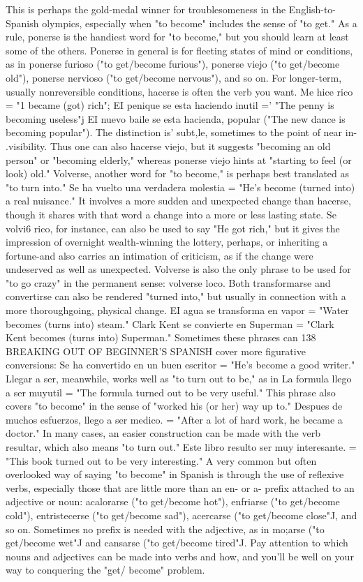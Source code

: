 \documentclass[14pt,a4paper,oneside]{memoir}
\begin{document}
This is perhaps the gold-medal winner for troublesomeness
in the English-to-Spanish olympics, especially when "to become" includes the sense of "to get." As a rule, ponerse is the handiest word for
"to become," but you should learn at least some of the others. Ponerse
in general is for fleeting states of mind or conditions, as in ponerse furioso ("to get/become furious"), ponerse viejo ("to get/become old"),
ponerse nervioso ("to get/become nervous"), and so on.
For longer-term, usually nonreversible conditions, hacerse is
often the verb you want. Me hice rico = "1 became (got) rich"; EI penique se esta haciendo inutil =' "The penny is becoming useless"j EI
nuevo baile se esta hacienda, popular ("The new dance is becoming
popular"). The distinction is' subt,le, sometimes to the point of near in-
.visibility. Thus one can also hacerse viejo, but it suggests "becoming
an old person" or "becoming elderly," whereas ponerse viejo hints at
"starting to feel (or look) old."
Volverse, another word for "to become," is perhaps best translated as "to turn into." Se ha vuelto una verdadera molestia = "He's
become (turned into) a real nuisance." It involves a more sudden and
unexpected change than hacerse, though it shares with that word a
change into a more or less lasting state. Se volvi6 rico, for instance,
can also be used to say "He got rich," but it gives the impression of
overnight wealth-winning the lottery, perhaps, or inheriting a fortune-and also carries an intimation of criticism, as if the change were
undeserved as well as unexpected. Volverse is also the only phrase to
be used for "to go crazy" in the permanent sense: volverse loco.
Both transformarse and convertirse can also be rendered
"turned into," but usually in connection with a more thoroughgoing,
physical change. EI agua se transforma en vapor = "Water becomes
(turns into) steam." Clark Kent se convierte en Superman = "Clark
Kent becomes (turns into) Superman." Sometimes these phrases can
138 BREAKING OUT OF BEGINNER'S SPANISH
cover more figurative conversions: Se ha convertido en un buen escritor = "He's become a good writer." Llegar a ser, meanwhile, works
well as "to turn out to be," as in La formula llego a ser muyutil =
"The formula turned out to be very useful." This phrase also covers
"to become" in the sense of "worked his (or her) way up to." Despues
de muchos esfuerzos, llego a ser medico. = "After a lot of hard work,
he became a doctor." In many cases, an easier construction can be
made with the verb resultar, which also means "to turn out." Este libro resulto ser muy interesante. = "This book turned out to be very
interesting."
A very common but often overlooked way of saying "to become" in Spanish is through the use of reflexive verbs, especially those
that are little more than an en- or a- prefix attached to an adjective or
noun: acalorarse ("to get/become hot"), enfriarse ("to get/become
cold"), entristecerse ("to get/become sad"), acercarse ("to get/become
close"J, and so on. Sometimes no prefix is needed with the adjective,
as in mo;arse ("to get/become wet"J and cansarse ("to get/become
tired"J. Pay attention to which nouns and adjectives can be made into
verbs and how, and you'll be well on your way to conquering the "get/
become" problem.
\end{document}
